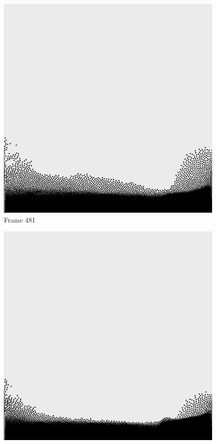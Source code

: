 \documentclass[a4paper, 12pt, oneside]{book}
\begin{document}
\begin{figure}[!ht]
    \addvspace{0.5ex}
        \begin{center}
            \includegraphics[width=\linewidth]{images/test_case_2/481.png}
            Frame 481
        \end{center}
    \endminipage
    \hfill
        \begin{center}
            \includegraphics[width=\linewidth]{images/test_case_2/501.png}

\end{center}
\end{figure}
\end{document}
